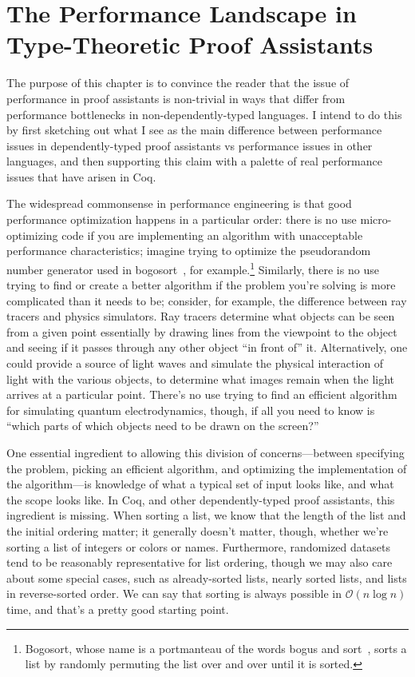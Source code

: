 \chapter{The Performance Landscape in Type-Theoretic Proof Assistants} \label{ch:perf-failures}

The purpose of this chapter is to convince the reader that the issue of performance in proof assistants is non-trivial in ways that differ from performance bottlenecks in non-dependently-typed languages.
I intend to do this by first sketching out what I see as the main difference between performance issues in dependently-typed proof assistants vs performance issues in other languages, and then supporting this claim with a palette of real performance issues that have arisen in Coq.

The widespread commonsense in performance engineering\cite{commonsense-perf-engineering-order-of-operations} is that good performance optimization happens in a particular order:
there is no use micro-optimizing code if you are implementing an algorithm with unacceptable performance characteristics; imagine trying to optimize the pseudorandom number generator used in bogosort~\cite{bogosort}, for example.\footnote{Bogosort, whose name is a portmanteau of the words bogus and sort~\cite{bogosort-name}, sorts a list by randomly permuting the list over and over until it is sorted.}
Similarly, there is no use trying to find or create a better algorithm if the problem you're solving is more complicated than it needs to be; consider, for example, the difference between ray tracers and physics simulators.
Ray tracers determine what objects can be seen from a given point essentially by drawing lines from the viewpoint to the object and seeing if it passes through any other object ``in front of'' it.
Alternatively, one could provide a source of light waves and simulate the physical interaction of light with the various objects, to determine what images remain when the light arrives at a particular point.
There's no use trying to find an efficient algorithm for simulating quantum electrodynamics, though, if all you need to know is ``which parts of which objects need to be drawn on the screen?''

One essential ingredient to allowing this division of concerns---between specifying the problem, picking an efficient algorithm, and optimizing the implementation of the algorithm---is knowledge of what a typical set of input looks like, and what the scope looks like.
In Coq, and other dependently-typed proof assistants, this ingredient is missing.
When sorting a list, we know that the length of the list and the initial ordering matter; it generally doesn't matter, though, whether we're sorting a list of integers or colors or names.
Furthermore, randomized datasets tend to be reasonably representative for list ordering, though we may also care about some special cases, such as already-sorted lists, nearly sorted lists, and lists in reverse-sorted order.
We can say that sorting is always possible in $\mathcal O(n\log n)$ time, and that's a pretty good starting point.

